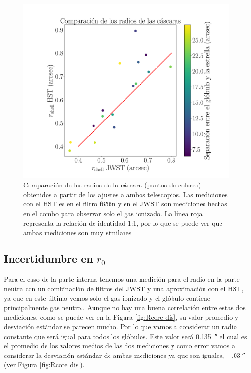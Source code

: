 \documentclass{book}
\begin{document}
\begin{figure}[htb]
    \centering
    \includegraphics[width=\textwidth]{imagenes_corregidas/rshell.pdf}
    \caption{Comparación de los radios de la cáscara (puntos de colores) obtenidos a partir de los ajustes a ambos telescopios. Las mediciones con el HST es en el filtro f656n y en el JWST son mediciones hechas en el combo para observar solo el gas ionizado. La línea roja representa la relación de identidad 1:1, por lo que se puede ver que ambas mediciones son muy similares}
    \label{fgi: Radios de la cascara}
\end{figure}

\subsection{\boldmath Incertidumbre en $r_0$}

Para el caso de la parte interna tenemos una medición para el radio en la parte neutra con un combinación de filtros del JWST y una aproximación con el HST, ya que en este último vemos solo el gas ionizado y el glóbulo contiene principalmente gas neutro.. Aunque no hay una buena correlación entre estas dos mediciones, como se puede ver en la Figura \ref{fig:Rcore dis}, su valor promedio y desviación estándar se parecen mucho. Por lo que vamos a considerar un radio constante que será igual para todos los glóbulos. Este valor será \SI{0.135}{\arcsecond} el cual es el promedio de los valores medios de las dos mediciones y como error vamos a considerar la desviación estándar de ambas mediciones ya que son iguales, $\pm\SI{.03}{\arcsecond}$ (ver Figura \ref{fig:Rcore dis}).
\end{document}
